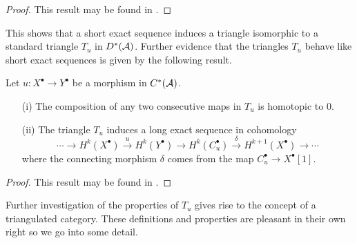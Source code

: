 \begin{proof}
  This result may be found in \cite[Chapter 1]{dimca2004sheaves}.
\end{proof}
This shows that a short exact sequence induces a triangle isomorphic to a standard triangle $T_u$ in $D^*(\AA)$.
Further evidence that the triangles $T_u$ behave like short exact sequences is given by the following result.
\begin{proposition}
 Let $u:X^\bullet \to Y^\bullet$ be a morphism in $C^*(\AA)$.
 \begin{enumerate}
   \item[(i)] The composition of any two consecutive maps in $T_u$ is homotopic to $0$.
   \item[(ii)] The triangle $T_u$ induces a long exact sequence in cohomology
   $$\cdots \to H^k(X^\bullet) \xrightarrow{u} H^k(Y^\bullet) \to H^k(C_u^\bullet) \xrightarrow{\delta} H^{k+1}(X^\bullet) \to \cdots$$
   where the connecting morphism $\delta$ comes from the map $C_u^\bullet \to X^\bullet[1]$.
 \end{enumerate}
\end{proposition}
\begin{proof}
  This result may be found in \cite[Chapter 1]{dimca2004sheaves}.
\end{proof}
Further investigation of the properties of $T_u$ gives rise to the concept of a triangulated category.
These definitions and properties are pleasant in their own right so we go into some detail.

